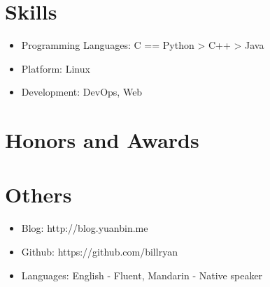 \documentclass{resume}
\begin{document}
\section{Skills}
\begin{itemize}[parsep=0.5ex]
  \item Programming Languages: C == Python > C++ > Java
  \item Platform: Linux
  \item Development: DevOps, Web
\end{itemize}

\section{Honors and Awards}

\section{Others}
\begin{itemize}
  \item Blog: http://blog.yuanbin.me
  \item Github: https://github.com/billryan
  \item Languages: English - Fluent, Mandarin - Native speaker
\end{itemize}
\end{document}
